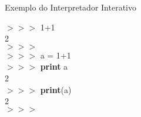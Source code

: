 \begin{algorithm}
    \caption{Exemplo do Interpretador Interativo}
    $>>>$ 1+1\\
    2\\
    $>>>$\\
    $>>>$ a = 1+1\\
    $>>>$ \textbf{print} a\\
    2\\
    $>>>$ \textbf{print}(a)\\
    2\\
    $>>>$\\
\end{algorithm}
